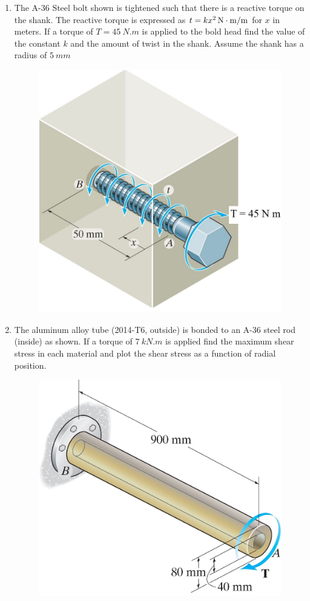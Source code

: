 \documentclass[12pt, oneside]{article}
\begin{document}
\begin{enumerate}
	\item %
		The A-36 Steel bolt shown is tightened such that there is a reactive torque on the shank.
		The reactive torque is expressed as $t = \SI[number-math-rm = \mathnormal, parse-numbers = false]{kx^2 }{N.m/m}$ for $x$ in meters.
		If a torque of $T=\SI{45 }{N.m}$ is applied to the bold head find the value of the constant $k$ and the amount of twist in the shank.
		Assume the shank has a radius of $\SI{5 }{mm}$
		\begin{figure}[H]
			\centering
			\includegraphics[width=0.6\linewidth]{5-69}
		\end{figure}

	\item %
		The aluminum alloy tube (2014-T6, outside) is bonded to an A-36 steel rod (inside) as shown.
		If a torque of $\SI{7 }{kN.m}$ is applied find the maximum shear stress in each material and plot the shear stress as a function of radial position.
		\begin{figure}[H]
			\centering
			\includegraphics[width=0.6\linewidth]{5-86}
		\end{figure}


\end{enumerate}
\end{document}

